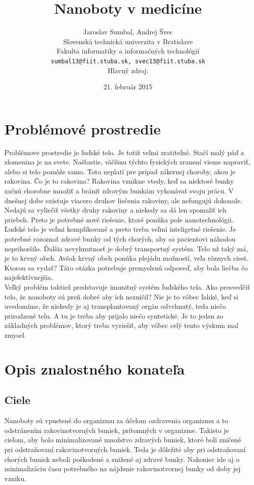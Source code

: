 \documentclass[10pt,twoside,slovak,a4paper]{article}
\title{Nanoboty v medicíne}
\author{Jaroslav Sumbal, Andrej Švec\\[2pt]
	{\small Slovenská technická univerzita v Bratislave}\\
	{\small Fakulta informatiky a informačných technológií}\\
	{\small \texttt{sumbal13@fiit.stuba.sk, svec13@fiit.stuba.sk}}\\
	{\small Hlavný zdroj: \cite{Zdroj}}
	}
\date{\small 21. február 2015} %
\begin{document}
\maketitle


\begin{abstract}


\end{abstract}

\section{Problémové prostredie}

Problémove prostredie je ľuďské telo. Je totiž veľmi zratiteľné. Stačí malý pád a zlomenina je na svete. Našťastie, väčšinu týchto fyzických zranení vieme napraviť, alebo si telo pomôže samo. Toto neplatí pre prípad zákernej choroby, akou je rakovina. Čo je to rakovina? Rakovina vznikne vtedy, keď sa niektoré bunky začnú chorobne množiť a brániť zdravým bunkám vykonávať svoju prácu. V dnešnej dobe existuje viacero druhov liečenia rakoviny, ale nefungujú dokonale. Nedajú sa vyliečiť všetky druhy rakoviny a niekedy sa dá len spomaliť ich priebeh. Preto je potrebné nové riešenie, ktoré ponúka pole nanotechnológii.
\\
Ľuďské telo je veľmi komplikované a preto treba veľmi inteligetné riešenie. Je potrebné rozoznať zdravé bunky od tých chorých, aby sa pacientovi náhodou neprihoršilo. Ďalšia nevyhnutnosť je dobrý transportný systém. Telo už taký má, je to krvný obeh. Avšak krvný obeh ponúka plejádu možností, veľa rôznych ciest. Ktorou sa vydať? Táto otázka potrebuje premyslenú odpoveď, aby bola liečba čo najefektívnejšia.
\\
Veľký problém taktiež predstavuje imunitný systém ľuďského tela. Ako presvedčiť telo, že nanoboty sú preň dobré aby ich nezničil? Nie je to vôbec ľahké, keď si uvedomíme, že niekedy je aj transplantovaný orgán odvrhnutý, teda niečo prirodzené telu. A tu je treba aby prijalo niečo syntetické. Je to jeden zo základných problémov, ktorý treba vyriešiť, aby vôbec celý tento výskum mal zmysel.

\section{Opis znalostného konateľa}

\subsection{Ciele}
Nanoboty sú vpustené do organizmu za účelom ozdravenia organizmu a to odstránením rakovinotvorných buniek, prítomných v organizme. Takisto je cieľom, aby bolo minimalizované množstvo zdravých buniek, ktoré boli zničené pri odstraňovaní rakovinotvorných buniek. Teda je dôležité aby pri odstraňovaní chorých buniek neboli poškodené a znižené aj zdravé bunky. Nakoniec ide aj o minimalizáciu času potrebného na nájdenie rakovinotvornej bunky od doby jej vzniku.
\end{document}
